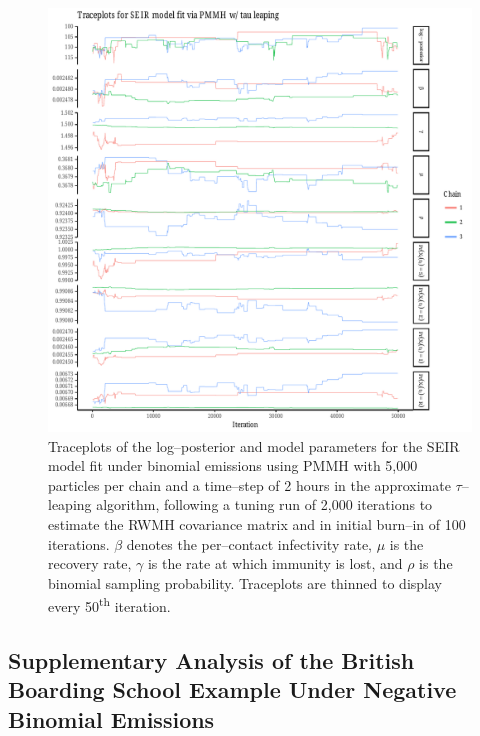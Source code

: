 \begin{figure}[htbp]
	\centering
	\includegraphics[width=\linewidth]{figures/bbs_seir_pmmh_traceplots.pdf}
	\caption[Traceplots for SEIR model parameters fit to the boarding school data using PMMH.]{Traceplots of the log--posterior and model parameters for the SEIR model fit under binomial emissions using PMMH with 5,000 particles per chain and a time--step of 2 hours in the approximate $ \tau $--leaping algorithm, following a tuning run of 2,000 iterations to estimate the RWMH covariance matrix and in initial burn--in of 100 iterations. $ \beta $ denotes the per--contact infectivity rate, $ \mu $ is the recovery rate, $ \gamma $ is the rate at which immunity is lost, and $ \rho $ is the binomial sampling probability. Traceplots are thinned to display every 50\textsuperscript{th} iteration.}
	\label{fig:bbs_seir_pmmh_traceplots}
\end{figure}

\newpage 

\subsection{Supplementary Analysis of the British Boarding School Example Under Negative Binomial Emissions}
\label{sec:bbs_neg_binom}

